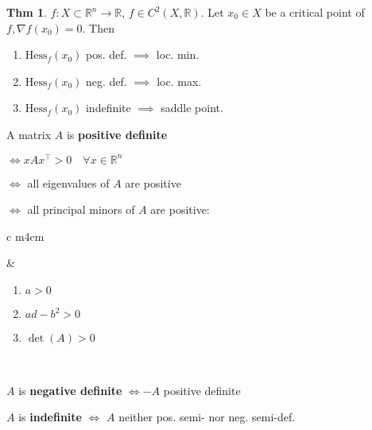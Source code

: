 \documentclass[a4paper, 10pt]{article}
\theoremstyle{definition}
\newtheorem*{theorem}{Thm}
\newcommand{\R}{\mathbb{R}}
\newcommand{\Hess}{\text{Hess}}
\begin{document}
\begin{theorem}
    \(f: X \subset \R^n \to \R\), \(f \in C^2(X, \R)\). Let \(x_0 \in X\) be a critical point of \(f, \nabla f(x_0) = 0\). Then
    \begin{enumerate}
        \item \(\Hess_f(x_0)\) pos. def. \(\implies\) loc. min.
        \item \(\Hess_f(x_0)\) neg. def. \(\implies\) loc. max.
        \item \(\Hess_f(x_0)\) indefinite \(\implies\) saddle point.
    \end{enumerate}
\end{theorem}

\begin{note*}
    A matrix \(A\) is \textbf{positive definite}
    
    \(\iff xAx^\top > 0 \quad \forall x \in \R^n\)

    \(\iff\) all eigenvalues of \(A\) are positive

    \(\iff\) all principal minors of \(A\) are positive:

    \begin{tabular}{c m{4cm}}
        & \begin{enumerate}
            \vspace{15pt}
            \item \(a > 0\)
            \item \(ad - b^2 > 0\)
            \item \(\det(A) > 0\)
        \end{enumerate} \\
    \end{tabular}

    \(A\) is \textbf{negative definite} \(\iff -A\) positive definite

    \(A\) is \textbf{indefinite} \(\iff\) \(A\) neither pos. semi- nor neg. semi-def.
\end{note*}
\end{document}
